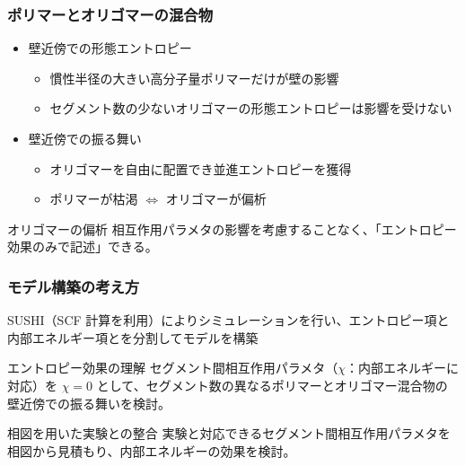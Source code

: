 \documentclass[unicode,12pt]{beamer}%
\begin{document}
%
\begin{frame}
	\frametitle{ポリマーとオリゴマーの混合物}
	\large
	\begin{itemize}
		\item 壁近傍での形態エントロピー
		\begin{itemize}
			\item 慣性半径の大きい高分子量ポリマー\color{red}だけ\color{black}が壁の影響
			\item セグメント数の少ないオリゴマーの形態エントロピーは影響を受けない
		\end{itemize}
		\item 壁近傍での振る舞い
		\begin{itemize}
			\item \color{red}オリゴマーを自由に配置\color{black}でき並進エントロピーを獲得
			\item \color{red}ポリマーが枯渇 $\Leftrightarrow$ オリゴマーが偏析\color{black}
		\end{itemize}
	\end{itemize}
	\begin{block}{オリゴマーの偏析}
	相互作用パラメタの影響を考慮することなく、\color{red}「エントロピー効果のみで記述」\color{black}できる。
	\end{block}
\end{frame}

\begin{frame}\frametitle{モデル構築の考え方}
	SUSHI（SCF 計算を利用）によりシミュレーションを行い、エントロピー項と内部エネルギー項とを分割してモデルを構築
	\begin{block}{エントロピー効果の理解}
	セグメント間相互作用パラメタ（$\chi$：内部エネルギーに対応）を $\chi = 0$ として、セグメント数の異なるポリマーとオリゴマー混合物の壁近傍での振る舞いを検討。
	\end{block}
	
	\begin{exampleblock}{相図を用いた実験との整合}
	実験と対応できるセグメント間相互作用パラメタを相図から見積もり、内部エネルギーの効果を検討。
	\end{exampleblock}
\end{frame}
\end{document}

